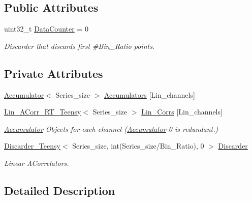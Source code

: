 \subsection*{Public Attributes}
\begin{DoxyCompactItemize}
\item 
uint32\+\_\+t \hyperlink{classMultiTau__ACorr__RT__Teensy_ac403944f1456e09036bef6dc60d5a0b2}{Data\+Counter} = 0
\begin{DoxyCompactList}\small\item\em Discarder that discards first \#\+Bin\+\_\+\+Ratio points. \end{DoxyCompactList}\end{DoxyCompactItemize}
\subsection*{Private Attributes}
\begin{DoxyCompactItemize}
\item 
\hyperlink{classAccumulator}{Accumulator}$<$ Series\+\_\+size $>$ \hyperlink{classMultiTau__ACorr__RT__Teensy_a1ad4057e0ab46e2919bfee2ba619113b}{Accumulators} \mbox{[}Lin\+\_\+channels\mbox{]}
\item 
\hyperlink{classLin__ACorr__RT__Teensy}{Lin\+\_\+\+A\+Corr\+\_\+\+R\+T\+\_\+\+Teensy}$<$ Series\+\_\+size $>$ \hyperlink{classMultiTau__ACorr__RT__Teensy_a1dc1e665268e5774e2810b74e6dbebc4}{Lin\+\_\+\+Corrs} \mbox{[}Lin\+\_\+channels\mbox{]}
\begin{DoxyCompactList}\small\item\em \hyperlink{classAccumulator}{Accumulator} Objects for each channel (\hyperlink{classAccumulator}{Accumulator} \textquotesingle{}0\textquotesingle{} is redundant.) \end{DoxyCompactList}\item 
\hyperlink{classDiscarder__Teensy}{Discarder\+\_\+\+Teensy}$<$ Series\+\_\+size, int(Series\+\_\+size/Bin\+\_\+\+Ratio), 0 $>$ \hyperlink{classMultiTau__ACorr__RT__Teensy_ae5ab139ae929212ccdc4eec86d257495}{Discarder}
\begin{DoxyCompactList}\small\item\em Linear A\+Correlators. \end{DoxyCompactList}\end{DoxyCompactItemize}


\subsection{Detailed Description}
